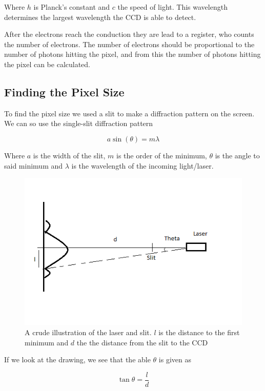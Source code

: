 \documentclass{emulateapj}
\begin{document}
Where $h$ is Planck's constant and $c$ the speed of light. This wavelength determines the largest wavelength the CCD is able to detect. 

After the electrons reach the conduction they are lead to a register, who counts the number of electrons. The number of electrons should be proportional to the number of photons hitting the pixel, and from this the number of photons hitting the pixel can be calculated.


\subsection{Finding the Pixel Size}
\label{sec:pixSize}
To find the pixel size we used a slit to make a diffraction pattern on the screen. We can so use the single-slit diffraction pattern

\begin{equation}
a \sin(\theta) = m\lambda
\label{eq:diffPatt}
\end{equation}

Where $a$ is the width of the slit, $m$ is the order of the minimum, $\theta$ is the angle to said minimum and $\lambda$ is the wavelength of the incoming light/laser.

\begin{figure}[H]
\centering
\includegraphics[scale=0.4]{diffPattern.png}
\caption{A crude illustration of the laser and slit. $l$ is the distance to the first minimum and $d$ the the distance from the slit to the CCD}
\end{figure}


If we look at the drawing, we see that the able $\theta$ is given as

\begin{equation}
\tan \theta = \frac{l}{d}
\end{equation}
\end{document}
